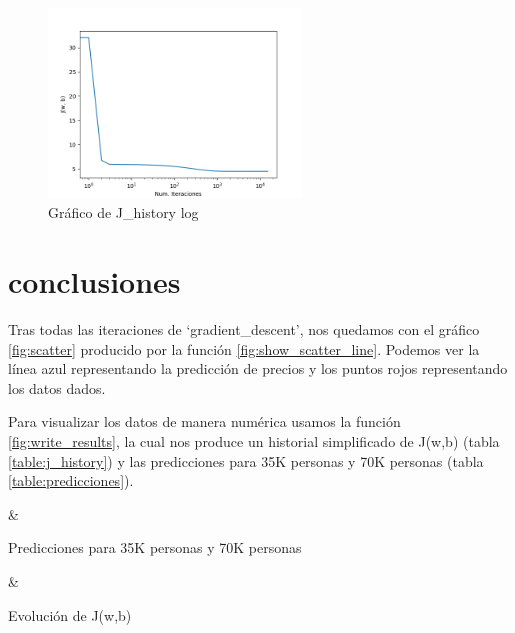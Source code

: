 \documentclass[6pt]{../../shared/AiTex}
\begin{document}
\begin{figure}[H]
    \centering
    \includegraphics[width=0.6\textwidth]{imagenes/J_history_log.png}
    \caption{Gráfico de J\_history log}
    \label{fig:history_log}
\end{figure}

\section{conclusiones}

Tras todas las iteraciones de `gradient\_descent', nos quedamos con el gráfico \ref{fig:scatter} producido por la función \ref{fig:show_scatter_line}. Podemos ver la línea azul representando la predicción de precios y los puntos rojos representando los datos dados.

Para visualizar los datos de manera numérica usamos la función \ref{fig:write_results}, la cual nos produce un historial simplificado de J(w,b) (tabla \ref{table:j_history}) y las predicciones para 35K personas y 70K personas (tabla \ref{table:predicciones}).

\begin{table}[H]
    \centering
    {\casos & \iterativo}
    \caption{Predicciones para 35K personas y 70K personas}
    \label{table:predicciones}
\end{table}

\begin{table}[H]
    \centering
    {\casos & \iterativo}
    \caption{Evolución de J(w,b)}
    \label{table:j_history}
\end{table}
\end{document}
